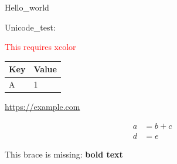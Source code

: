 \documentclass{article}
\begin{document}
Hello\_world

Unicode\_test: 🙂

\textcolor{red}{This requires xcolor}

\begin{tabular}{ll}
\toprule
Key & Value \\
\midrule
A & 1 \\
\bottomrule
\end{tabular}

\url{https://example.com}

\begin{align}
a &= b + c \\
d &= e
\end{align}


This brace is missing: \textbf{bold text}
\end{document}

